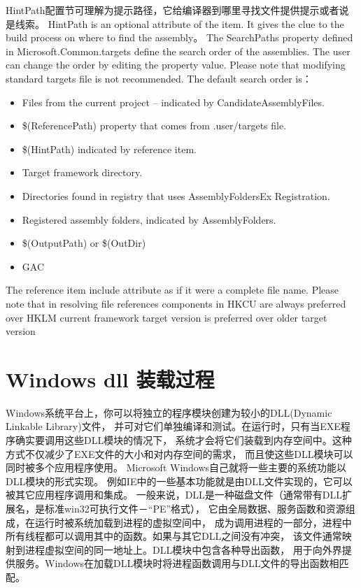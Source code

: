 \documentclass{book}
\begin{document}
HintPath配置节可理解为提示路径，它给编译器到哪里寻找文件提供提示或者说是线索。
HintPath is an optional attribute of the item. 
It gives the clue to the build process on where to find the assembly。
The SearchPaths property defined in Microsoft.Common.targets define the search order of the assemblies. 
The user can change the order by editing the property value. 
Please note that modifying standard targets file is not recommended.
The default search order is：

\begin{itemize}
\item{Files from the current project – indicated by {CandidateAssemblyFiles}.}
\item{\$(ReferencePath) property that comes from .user/targets file.}
\item{\$(HintPath) indicated by reference item.}
\item{Target framework directory.}
\item{Directories found in registry that uses AssemblyFoldersEx Registration.}
\item{Registered assembly folders, indicated by {AssemblyFolders}.}
\item{\$(OutputPath) or \$(OutDir)}
\item{GAC}
\end{itemize}
 
The reference item include attribute as if it were a complete file name.
Please note that in resolving file references
components in HKCU are always preferred over HKLM
current framework target version is preferred over older target version

\section{Windows dll 装载过程 }

Windows系统平台上，你可以将独立的程序模块创建为较小的DLL(Dynamic Linkable Library)文件，
并可对它们单独编译和测试。在运行时，只有当EXE程序确实要调用这些DLL模块的情况下，
系统才会将它们装载到内存空间中。这种方式不仅减少了EXE文件的大小和对内存空间的需求，
而且使这些DLL模块可以同时被多个应用程序使用。
Microsoft Windows自己就将一些主要的系统功能以DLL模块的形式实现。
例如IE中的一些基本功能就是由DLL文件实现的，它可以被其它应用程序调用和集成。
一般来说，DLL是一种磁盘文件（通常带有DLL扩展名，是标准win32可执行文件－“PE”格式），
它由全局数据、服务函数和资源组成，在运行时被系统加载到进程的虚拟空间中，
成为调用进程的一部分，进程中所有线程都可以调用其中的函数。如果与其它DLL之间没有冲突，
该文件通常映射到进程虚拟空间的同一地址上。DLL模块中包含各种导出函数，
用于向外界提供服务。Windows在加载DLL模块时将进程函数调用与DLL文件的导出函数相匹配。
\end{document}
